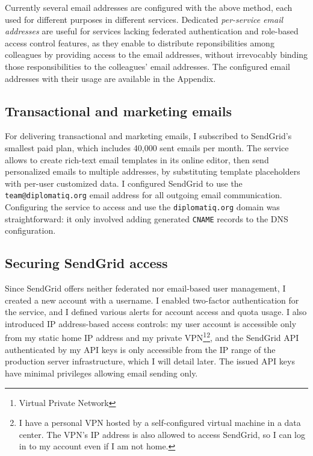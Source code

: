 Currently several email addresses are configured with the above method, each used for different purposes in different services. Dedicated \emph{per-service email addresses} are useful for services lacking federated authentication and role-based access control features, as they enable to distribute reponsibilities among colleagues by providing access to the email addresses, without irrevocably binding those responsibilities to the colleagues' email addresses. The configured email addresses with their usage are available in the Appendix.

\subsection{Transactional and marketing emails}

For delivering transactional and marketing emails, I subscribed to SendGrid's smallest paid plan, which includes 40,000 sent emails per month. The service allows to create rich-text email templates in its online editor, then send personalized emails to multiple addresses, by substituting template placeholders with per-user customized data. I configured SendGrid to use the \lstinline{team@diplomatiq.org} email address for all outgoing email communication. Configuring the service to access and use the \lstinline{diplomatiq.org} domain was straightforward: it only involved adding generated \lstinline{CNAME} records to the DNS configuration.

\subsection{Securing SendGrid access}

Since SendGrid offers neither federated nor email-based user management, I created a new account with a username. I enabled two-factor authentication for the service, and I defined various alerts for account access and quota usage. I also introduced IP address-based access controls: my user account is accessible only from my static home IP address and my private VPN\footnote{Virtual Private Network}\footnote{I have a personal VPN hosted by a self-configured virtual machine in a data center. The VPN's IP address is also allowed to access SendGrid, so I can log in to my account even if I am not home.}, and the SendGrid API authenticated by my API keys is only accessible from the IP range of the production server infrastructure, which I will detail later. The issued API keys have minimal privileges allowing email sending only.

